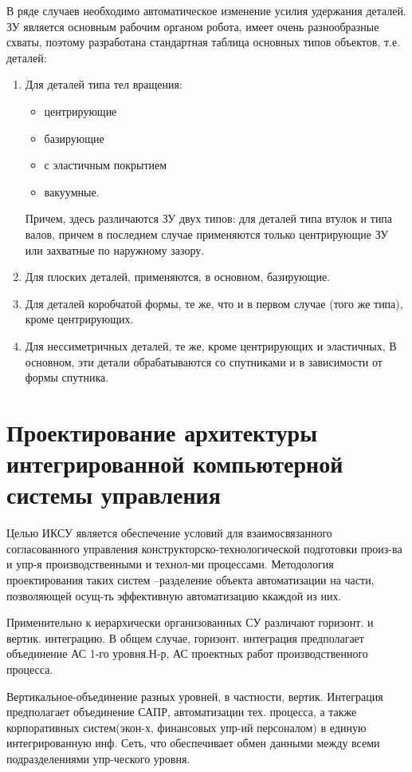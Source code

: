 \documentclass[unicode, 12pt, a4paper, oneside]{article}
\begin{document}
В ряде случаев необходимо автоматическое изменение усилия удержания деталей.
ЗУ является основным рабочим органом робота, имеет очень разнообразные схваты, поэтому разработана стандартная таблица основных типов объектов, т.е. деталей:
\begin{enumerate}
\item Для деталей типа тел вращения:
\begin{itemize}
\item центрирующие
\item	базирующие
\item	с эластичным покрытием
\item	вакуумные.
\end{itemize}

Причем, здесь различаются ЗУ двух типов: для деталей типа втулок и типа валов, причем в последнем случае применяются только центрирующие ЗУ или захватные по наружному зазору.
\item Для плоских деталей, применяются, в основном, базирующие.
\item Для деталей коробчатой формы, те же, что и в первом случае (того же типа), кроме центрирующих.
\item Для нессиметричных деталей, те же, кроме центрирующих и эластичных, В основном, эти детали обрабатываются со спутниками и в зависимости от формы спутника.
\end{enumerate}

\section{Проектирование  архитектуры интегрированной компьютерной системы управления }

Целью ИКСУ является обеспечение условий для взаимосвязанного согласованного управления конструкторско-технологической подготовки произ-ва и упр-я производственными и технол-ми процессами. Методология проектирования таких систем –разделение объекта автоматизации на части, позволяющей осущ-ть эффективную автоматизацию ккаждой из них.


Применительно к иерархически организованных СУ различают горизонт. и вертик. интеграцию. В общем случае, горизонт. интеграция предполагает объединение АС 1-го уровня.Н-р, АС проектных работ производственного процесса.

Вертикальное-объединение разных уровней, в частности, вертик. Интеграция предполагает объединение САПР, автоматизации тех. процесса, а также корпоративных систем(экон-х, финансовых упр-ий персоналом) в единую интегрированную инф. Сеть, что обеспечивает обмен данными между всеми подразделениями упр-ческого уровня.
\end{document}
